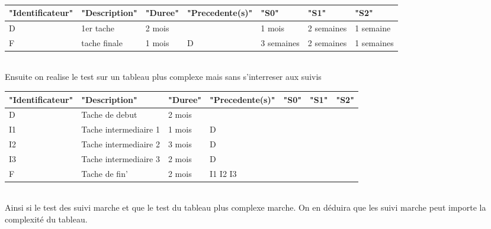 \documentclass{article}
\begin{document}
\\
\begin{table}[!ht]
    \centering
    \begin{tabular}{|l|l|l|l|l|l|l|}
    \hline
        "Identificateur" & "Description" & "Duree" & "Precedente(s)" & "S0" & "S1" & "S2" \\ \hline
        D & 1er tache & 2 mois & ~ & 1 mois & 2 semaines & 1 semaine \\ \hline
        F & tache finale & 1 mois & D & 3 semaines & 2 semaines & 1 semaines \\ \hline
    \end{tabular}
\end{table}
\\
Ensuite on realise le test sur un tableau plus complexe mais sans s'interreser aux suivis
\\
\begin{table}[!ht]
    \centering
    \begin{tabular}{|l|l|l|l|l|l|l|}
    \hline
        "Identificateur" & "Description" & "Duree" & "Precedente(s)" & "S0" & "S1" & "S2" \\ \hline
        D & Tache de debut & 2 mois & ~ & ~ & ~ & ~ \\ \hline
        I1 & Tache intermediaire 1 & 1 mois & D & ~ & ~ & ~ \\ \hline
        I2 & Tache intermediaire 2 & 3 mois & D & ~ & ~ & ~ \\ \hline
        I3 & Tache intermediaire 3 & 2 mois & D & ~ & ~ & ~ \\ \hline
        F & Tache de fin' & 2 mois & I1 I2 I3 & ~ & ~ & ~ \\ \hline
    \end{tabular}
\end{table}
\\
Ainsi si le test des suivi marche et que le test du tableau plus complexe marche. On en déduira que les suivi marche peut importe la complexité du tableau.
\end{document}
